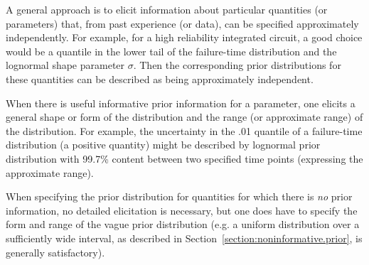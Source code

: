 A general approach is to elicit information about particular
quantities (or parameters) that, from past experience (or data), can
be specified approximately independently. For example, for a high
reliability integrated circuit, a good choice would be a quantile in
the lower tail of the failure-time distribution and the lognormal
shape parameter $\sigma$.  Then the corresponding prior
distributions for these quantities can be described as being
approximately independent.

When there is useful informative prior information for a parameter, one
elicits a general shape or form of the distribution and the range (or
approximate range) of the distribution.  For example, the uncertainty
in the .01 quantile of a failure-time distribution (a positive
quantity) might be described by lognormal prior distribution with
99.7\% content between two specified time points (expressing the
approximate range).

When specifying the prior distribution for quantities for which there
is {\em no}  prior information, no detailed
elicitation is necessary, but one does have to specify the form and
range of the vague prior distribution
(e.g. a uniform distribution over a sufficiently wide
interval, as described in Section~\ref{section:noninformative.prior},
is generally satisfactory).

